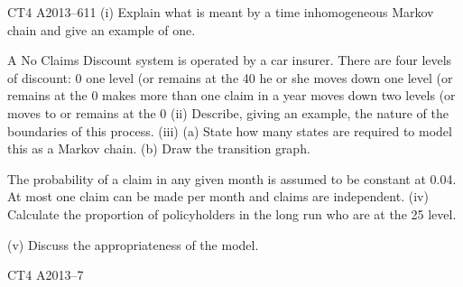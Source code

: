 \documentclass[a4paper,12pt]{article}
\begin{document}
\begin{enumerate}

CT4 A2013–611
(i)
Explain what is meant by a time inhomogeneous Markov chain and give an
example of one.

A No Claims Discount system is operated by a car insurer. There are four levels of
discount: 0%
one level (or remains at the 40%
he or she moves down one level (or remains at the 0%
makes more than one claim in a year moves down two levels (or moves to or remains
at the 0%
(ii) Describe, giving an example, the nature of the boundaries of this process. 
(iii) (a)
State how many states are required to model this as a Markov chain.
(b)
Draw the transition graph.

The probability of a claim in any given month is assumed to be constant at 0.04. At
most one claim can be made per month and claims are independent.
(iv) Calculate the proportion of policyholders in the long run who are at the 25%
level.

(v) Discuss the appropriateness of the model.

CT4 A2013–7


\newpage



\end{enumerate}
\end{document}
